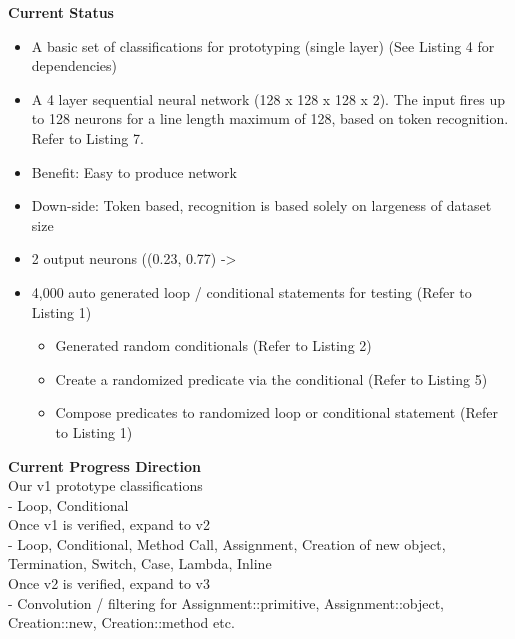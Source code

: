 \documentclass{article}
\begin{document}
    \textbf{Current Status}
    \begin{itemize}
        \item A basic set of classifications for prototyping (single layer) (See Listing 4 for dependencies)
        \item A 4 layer sequential neural network (128 x 128 x 128 x 2). The input fires up to 128 neurons for a line length maximum of 128, based on token recognition. Refer to Listing 7.
        \item Benefit: Easy to produce network
        \item Down-side: Token based, recognition is based solely on largeness of dataset size
        \item 2 output neurons ((0.23, 0.77) -> %
        \item 4,000 auto generated loop / conditional statements for testing (Refer to Listing 1)
        \begin{itemize}
            \item Generated random conditionals (Refer to Listing 2)
            \item Create a randomized predicate via the conditional (Refer to Listing 5)
            \item Compose predicates to randomized loop or conditional statement (Refer to Listing 1)
        \end{itemize}
    \end{itemize}

    \textbf{Current Progress Direction} \\
    Our v1 prototype classifications\\
    - Loop, Conditional\\
    Once v1 is verified, expand to v2\\
    - Loop, Conditional, Method Call, Assignment, Creation of new object, Termination, Switch, Case, Lambda, Inline\\
    Once v2 is verified, expand to v3\\
    - Convolution / filtering for Assignment::primitive, Assignment::object, Creation::new, Creation::method etc.\\
\end{document}
